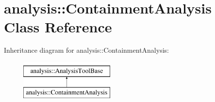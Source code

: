 \hypertarget{classanalysis_1_1ContainmentAnalysis}{}\section{analysis\+:\+:Containment\+Analysis Class Reference}
\label{classanalysis_1_1ContainmentAnalysis}
Inheritance diagram for analysis\+:\+:Containment\+Analysis\+:\begin{figure}[H]
\begin{center}
\leavevmode
\includegraphics[height=2.000000cm]{classanalysis_1_1ContainmentAnalysis}
\end{center}
\end{figure}

